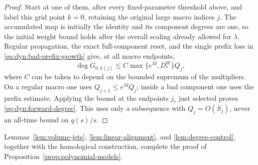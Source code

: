 \begin{proof}
Start at one of them, after every fixed-parameter threshold above,
and label this grid point $k=0$, retaining the original large macro
indices $j$.  The accumulated map is initially the identity and its
component degrees are one, so the initial weight bound holds after
the overall scaling already allowed for $\lambda$.  Regular
propagation, the exact full-component reset, and the single prefix
loss in \eqref{eq:dyn:bad-prefix-growth} give, at all macro endpoints,
\[
 \deg G_{0,k(j)}\le
 C\max\{e^M,D_*^W\}Q_j,
\]
where $C$ can be taken to depend on the bounded supremum of the
multipliers.  On a regular macro one uses
$Q_{j+1}\le e^M Q_j$; inside a bad component one uses the prefix
estimate.  Applying the bound at the endpoints $j_r$ just selected
proves \eqref{eq:dyn:forward-degree}.  This uses only a subsequence
with $Q_j=O(S_j)$, never an all-time bound on $q(s)/s$.
\end{proof}

Lemmas~\ref{lem:volume-jets}, \ref{lem:linear-alignment}, and
\ref{lem:degree-control}, together with the homological construction,
complete the proof of Proposition~\ref{prop:polynomial-models}.
